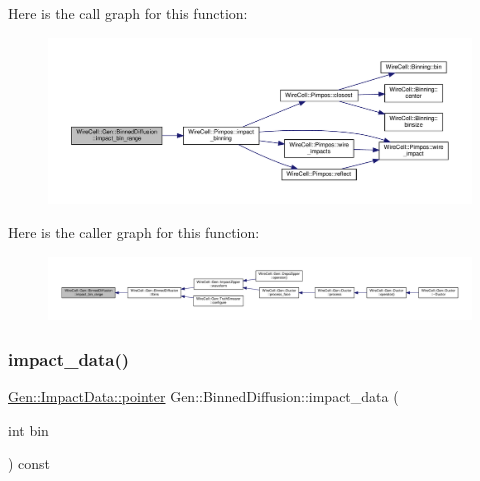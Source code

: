 Here is the call graph for this function\+:
\nopagebreak
\begin{figure}[H]
\begin{center}
\leavevmode
\includegraphics[width=350pt]{class_wire_cell_1_1_gen_1_1_binned_diffusion_a7b7d0d8f0c0357f7a015dce980b07afc_cgraph}
\end{center}
\end{figure}
Here is the caller graph for this function\+:
\nopagebreak
\begin{figure}[H]
\begin{center}
\leavevmode
\includegraphics[width=350pt]{class_wire_cell_1_1_gen_1_1_binned_diffusion_a7b7d0d8f0c0357f7a015dce980b07afc_icgraph}
\end{center}
\end{figure}
\mbox{\label{class_wire_cell_1_1_gen_1_1_binned_diffusion_a22377d1afccdee836981ce2979ab49b4}} 
\subsubsection{\texorpdfstring{impact\+\_\+data()}{impact\_data()}}
{\footnotesize\ttfamily \hyperlink{class_wire_cell_1_1_gen_1_1_impact_data_a4fb9b565e1525c7ccde05ded67f467c2}{Gen\+::\+Impact\+Data\+::pointer} Gen\+::\+Binned\+Diffusion\+::impact\+\_\+data (\begin{DoxyParamCaption}\item[{int}]{bin }\end{DoxyParamCaption}) const}

